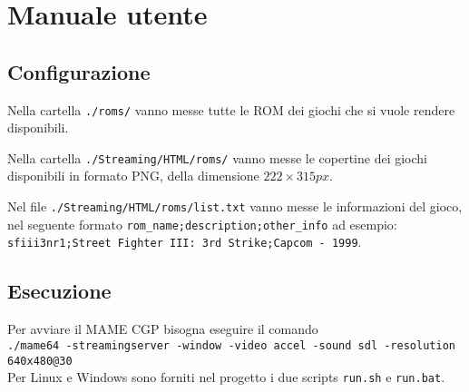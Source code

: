 \chapter{Manuale utente}

\section{Configurazione}

Nella cartella \verb|./roms/| vanno messe tutte le ROM dei giochi che si vuole rendere disponibili.

Nella cartella \verb|./Streaming/HTML/roms/| vanno messe le copertine dei giochi disponibili in formato PNG, della dimensione $222 \times 315px$.

Nel file \verb|./Streaming/HTML/roms/list.txt| vanno messe le informazioni del gioco, nel seguente formato \verb|rom_name;description;other_info| ad esempio:\\ \verb|sfiii3nr1;Street Fighter III: 3rd Strike;Capcom - 1999|.

\section{Esecuzione}

Per avviare il MAME CGP bisogna eseguire il comando\\ \verb|./mame64 -streamingserver -window -video accel -sound sdl -resolution 640x480@30|\\Per Linux e Windows sono forniti nel progetto i due scripts \verb|run.sh| e \verb|run.bat|.